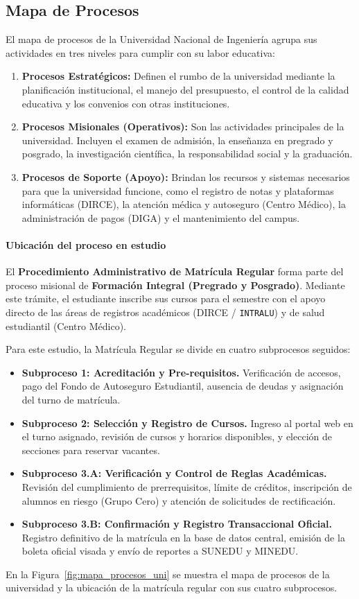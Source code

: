 \subsection{Mapa de Procesos}

El mapa de procesos de la Universidad Nacional de Ingeniería agrupa sus actividades en tres niveles para cumplir con su labor educativa:

\begin{enumerate}
    \item \textbf{Procesos Estratégicos:} Definen el rumbo de la universidad mediante la planificación institucional, el manejo del presupuesto, el control de la calidad educativa y los convenios con otras instituciones.
    \item \textbf{Procesos Misionales (Operativos):} Son las actividades principales de la universidad. Incluyen el examen de admisión, la enseñanza en pregrado y posgrado, la investigación científica, la responsabilidad social y la graduación.
    \item \textbf{Procesos de Soporte (Apoyo):} Brindan los recursos y sistemas necesarios para que la universidad funcione, como el registro de notas y plataformas informáticas (DIRCE), la atención médica y autoseguro (Centro Médico), la administración de pagos (DIGA) y el mantenimiento del campus.
\end{enumerate}

\paragraph{Ubicación del proceso en estudio}
El \textbf{Procedimiento Administrativo de Matrícula Regular} forma parte del proceso misional de \textbf{Formación Integral (Pregrado y Posgrado)}. Mediante este trámite, el estudiante inscribe sus cursos para el semestre con el apoyo directo de las áreas de registros académicos (DIRCE / \texttt{INTRALU}) y de salud estudiantil (Centro Médico).

Para este estudio, la Matrícula Regular se divide en cuatro subprocesos seguidos:
\begin{itemize}
    \item \textbf{Subproceso 1: Acreditación y Pre-requisitos.} Verificación de accesos, pago del Fondo de Autoseguro Estudiantil, ausencia de deudas y asignación del turno de matrícula.
    \item \textbf{Subproceso 2: Selección y Registro de Cursos.} Ingreso al portal web en el turno asignado, revisión de cursos y horarios disponibles, y elección de secciones para reservar vacantes.
    \item \textbf{Subproceso 3.A: Verificación y Control de Reglas Académicas.} Revisión del cumplimiento de prerrequisitos, límite de créditos, inscripción de alumnos en riesgo (Grupo Cero) y atención de solicitudes de rectificación.
    \item \textbf{Subproceso 3.B: Confirmación y Registro Transaccional Oficial.} Registro definitivo de la matrícula en la base de datos central, emisión de la boleta oficial visada y envío de reportes a SUNEDU y MINEDU.
\end{itemize}

En la Figura~\ref{fig:mapa_procesos_uni} se muestra el mapa de procesos de la universidad y la ubicación de la matrícula regular con sus cuatro subprocesos.


